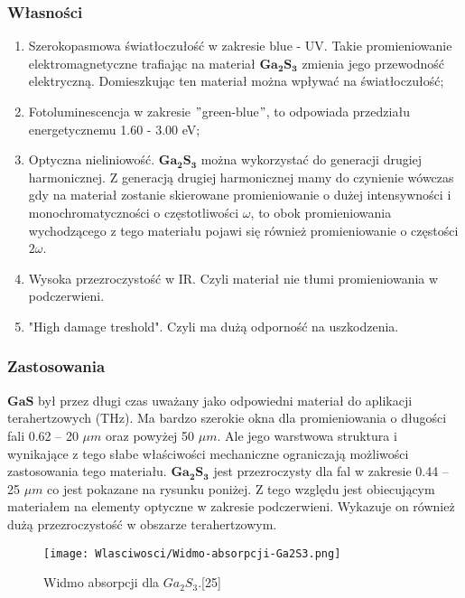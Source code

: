 \subsubsection{Własności}
\begin{enumerate}
	\item Szerokopasmowa światłoczułość w zakresie blue - UV. Takie promieniowanie elektromagnetyczne trafiając na materiał $\mathbf{Ga_{2}S_{3}}$ zmienia jego przewodność elektryczną. Domieszkując ten materiał można wpływać na światłoczułość;
	\item Fotoluminescencja w zakresie $"$green-blue$"$, to odpowiada przedziału energetycznemu 1.60 - 3.00 eV;
	\item Optyczna nieliniowość. $\mathbf{Ga_{2}S_{3}}$ można wykorzystać do generacji drugiej harmonicznej. Z generacją drugiej harmonicznej mamy do czynienie wówczas gdy na materiał zostanie skierowane promieniowanie o dużej intensywności i monochromatyczności o częstotliwości $\omega$, to obok promieniowania wychodzącego z tego materiału pojawi się również promieniowanie o częstości $2\omega$.
	\item Wysoka przezroczystość w IR. Czyli materiał nie tłumi promieniowania w podczerwieni.
	\item "High damage treshold". Czyli ma dużą odporność na uszkodzenia.
\end{enumerate}

\subsubsection{Zastosowania}

$\mathbf{GaS}$ był przez długi czas uważany jako odpowiedni materiał do aplikacji terahertzowych (THz). Ma bardzo szerokie okna dla promieniowania o długości fali 0.62 – 20 $\mu m$ oraz powyżej 50 $\mu m$. Ale jego warstwowa struktura i wynikające z tego słabe właściwości mechaniczne ograniczają możliwości zastosowania tego materiału. $\mathbf{Ga_{2}S_{3}}$ jest przezroczysty dla fal w zakresie 0.44 – 25 $\mu m$ co jest pokazane na rysunku poniżej. Z tego względu jest obiecującym materiałem na elementy optyczne w zakresie podczerwieni. Wykazuje on również dużą przezroczystość w obszarze terahertzowym. 

\begin{figure}[H]
	\begin{center}
		\texttt{[image: Wlasciwosci/Widmo-absorpcji-Ga2S3.png]}
		\caption{Widmo absorpcji dla $Ga_{2}S_{3}$.[25]}
	\end{center}
\end{figure}


